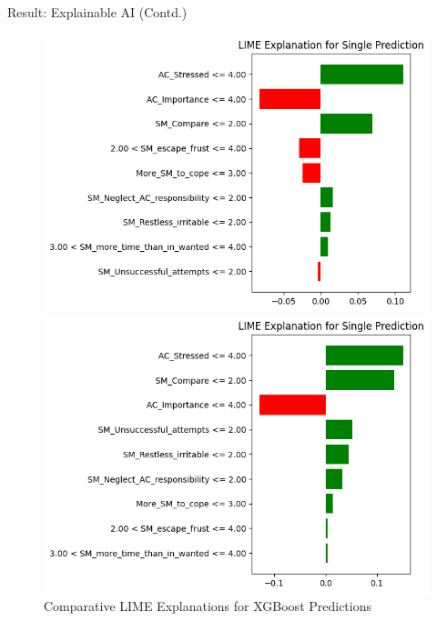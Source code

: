 \documentclass{beamer}
\begin{document}
\begin{frame}{Result: Explainable AI (Contd.)}
\begin{figure}
    \centering
    \begin{minipage}{0.48\linewidth}
        \centering
        \includegraphics[width=\linewidth]{lime.png}
    \end{minipage}
    \hfill
    \begin{minipage}{0.48\linewidth}
        \centering
        \includegraphics[width=\linewidth]{new LIME.png}

    \end{minipage}
    \caption{Comparative LIME Explanations for XGBoost Predictions}
    \label{fig:lime-comparison}
\end{figure}
\end{frame}
\end{document}
